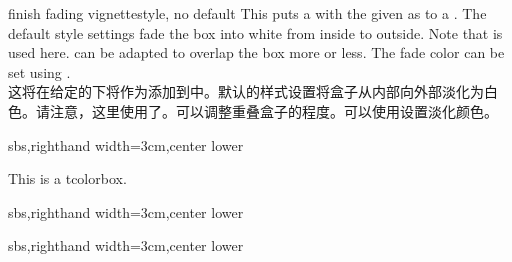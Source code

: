 \begin{docTcbKey}[][doc new=2016-04-22]{finish fading vignette}{}{style, no default}
This puts a  with the given 
as  to a .
The default style settings fade the box into white from inside to outside.
Note that  is used here.
 can be adapted to overlap the box
more or less. The fade color can be set using
.
\\这将在给定的下将作为添加到中。默认的样式设置将盒子从内部向外部淡化为白色。请注意，这里使用了。可以调整重叠盒子的程度。可以使用设置淡化颜色。

\begin{dispExample*}{sbs,righthand width=3cm,center lower}
\begin{tcolorbox}[enhanced,size=small,
colback=green!10,colframe=green!50!black,
boxrule=0.5mm,titlerule=0mm,
title=My title,center title,fonttitle=\bfseries,
finish fading vignette={size=2mm}]
  This is a tcolorbox.
\end{tcolorbox}
\end{dispExample*}

\begin{dispExample*}{sbs,righthand width=3cm,center lower}
\end{dispExample*}

\begin{dispExample*}{sbs,righthand width=3cm,center lower}
\begin{tcolorbox}[colback=blue!50!black,size=small,
title=Example]
\end{tcolorbox}
\end{dispExample*}

\end{docTcbKey}


